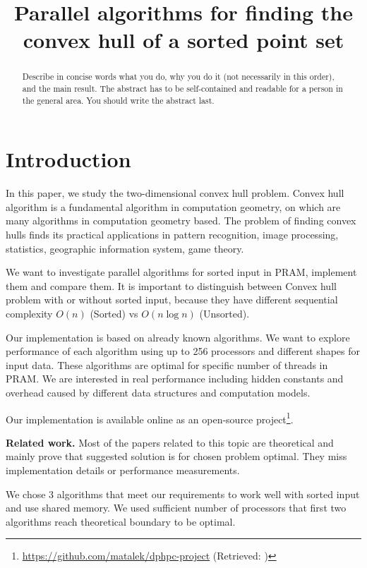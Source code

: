 \documentclass[letterpaper]{article}
\title{Parallel algorithms for finding the convex hull of a sorted point set}
\newcommand{\mypar}[1]{{\bf #1.}}
\theoremstyle{definition}
\begin{document}
%
\maketitle
%

\begin{abstract}
Describe in concise words what you do, why you do it (not necessarily
in this order), and the main result.  The abstract has to be
self-contained and readable for a person in the general area. You
should write the abstract last.
\end{abstract}

\section{Introduction}\label{sec:intro}

In this paper, we study the two-dimensional convex hull problem. Convex hull algorithm is a fundamental algorithm in computation geometry, on which are many algorithms in computation geometry based. The problem of finding convex hulls finds its practical applications in pattern recognition, image processing, statistics, geographic information system, game theory. 

We want to investigate parallel algorithms for sorted input in PRAM, implement them and compare them. It is important to distinguish between Convex hull problem with or without sorted input, because they have different sequential complexity $O(n)$ (Sorted) vs $O(n\log n)$ (Unsorted).

Our implementation is based on already known algorithms. We want to explore performance of each algorithm using up to 256 processors and different shapes for input data. These algorithms are optimal for specific number of threads in PRAM. We are interested in real performance including hidden constants and overhead caused by different data structures and computation models.

Our implementation is available online as an open-source project\footnote{\url{https://github.com/matalek/dphpc-project} (Retrieved: )}.

\mypar{Related work} Most of the papers related to this topic are theoretical and mainly prove that suggested solution is for chosen problem optimal. They miss implementation details or performance measurements.

We chose 3 algorithms that meet our requirements to work well with sorted input and use shared memory. We used sufficient number of processors that first two algorithms reach theoretical boundary to be optimal. 
\end{document}
